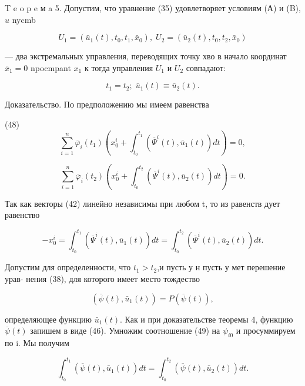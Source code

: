 \documentclass[10pt]{article}
\begin{document}
T e o p e м a 5. Допустим, что уравнение (35) удовлетворяет условиям (А) и (B), \(u\) nycmb

\[
{U}_{1} = \left( {{\bar{u}}_{1}\left( t\right),{t}_{0},{t}_{1},{\bar{x}}_{0}}\right),\;{U}_{2} = \left( {{\bar{u}}_{2}\left( t\right),{t}_{0},{t}_{2},{\bar{x}}_{0}}\right)
\]

— два экстремальных управления, переводящих точку хво в начало координат \({\bar{x}}_{1} = 0\) npocmpant \({x}_{1}\) к тогда управления \({U}_{1}\) и \({U}_{2}\) совпадают:

\[
{t}_{1} = {t}_{2};\;{\bar{u}}_{1}\left( t\right)  \equiv  {\bar{u}}_{2}\left( t\right).
\]

Доказательство. По предположению мы имеем равенства

(48)
\[
\mathop{\sum }\limits_{{i = 1}}^{n}{\overline{\varphi }}_{i}\left( {t}_{1}\right) \left( {{x}_{0}^{i} + {\int }_{{t}_{0}}^{{t}_{1}}\left( {{\overline{\Psi }}^{i}\left( t\right),{\bar{u}}_{1}\left( t\right) }\right) {dt}}\right)  = 0,
\]

\[
\mathop{\sum }\limits_{{i = 1}}^{n}{\overline{\varphi }}_{i}\left( {t}_{2}\right) \left( {{x}_{0}^{i} + {\int }_{{t}_{0}}^{{t}_{2}}\left( {{\overline{\Psi }}^{i}\left( t\right),{\bar{u}}_{2}\left( t\right) }\right) {dt}}\right)  = 0.
\]

Так как векторы (42) линейно независимы при любом t, то из равенств дует равенство

\[
- {x}_{0}^{i} = {\int }_{{t}_{0}}^{{t}_{1}}\left( {{\overline{\Psi }}^{i}\left( t\right),{\bar{u}}_{1}\left( t\right) }\right) {dt} = {\int }_{{t}_{0}}^{{t}_{2}}\left( {{\overline{\Psi }}^{i}\left( t\right),{\bar{u}}_{2}\left( t\right) }\right) {dt}. \tag{49}
\]

Допустим для определенности, что \({t}_{1} > {t}_{2}\),и пусть у н пусть у мет перешение урав- нения (38), для которого имеет место тождество

\[
\left( {\overline{\psi }\left( t\right),{\bar{u}}_{1}\left( t\right) }\right)  = P\left( {\overline{\psi }\left( t\right) }\right),
\]

определяющее функцию \({\bar{u}}_{1}\left( t\right)\). Как и при доказательстве теоремы 4, функцию \(\overline{\psi }\left( t\right)\) запишем в виде (46). Умножим соотношение (49) на \({\psi }_{i0}\) и просуммируем по i. Мы получим

\[
{\int }_{{t}_{0}}^{{t}_{1}}\left( {\overline{\psi }\left( t\right),{\bar{u}}_{1}\left( t\right) }\right) {dt} = {\int }_{{t}_{0}}^{{t}_{2}}\left( {\overline{\psi }\left( t\right),{\bar{u}}_{2}\left( t\right) }\right) {dt}.
\]
\end{document}
